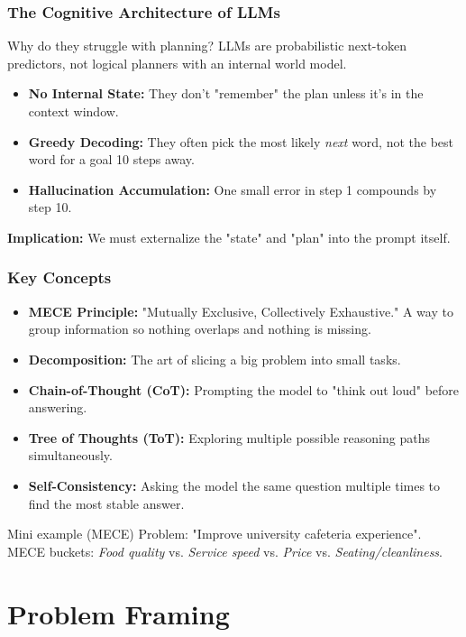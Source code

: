 \documentclass{beamer}
\begin{document}
\begin{frame}
    \frametitle{The Cognitive Architecture of LLMs}
    \begin{block}{Why do they struggle with planning?}
        LLMs are probabilistic next-token predictors, not logical planners with an internal world model.
    \end{block}
    \begin{itemize}
        \item \textbf{No Internal State:} They don't "remember" the plan unless it's in the context window.
        \item \textbf{Greedy Decoding:} They often pick the most likely \textit{next} word, not the best word for a goal 10 steps away.
        \item \textbf{Hallucination Accumulation:} One small error in step 1 compounds by step 10.
    \end{itemize}
    \textbf{Implication:} We must externalize the "state" and "plan" into the prompt itself.
\end{frame}

\begin{frame}
    \frametitle{Key Concepts}
    \begin{itemize}
        \item \textbf{MECE Principle:} "Mutually Exclusive, Collectively Exhaustive." A way to group information so nothing overlaps and nothing is missing.
        \item \textbf{Decomposition:} The art of slicing a big problem into small tasks.
        \item \textbf{Chain-of-Thought (CoT):} Prompting the model to "think out loud" before answering.
        \item \textbf{Tree of Thoughts (ToT):} Exploring multiple possible reasoning paths simultaneously.
        \item \textbf{Self-Consistency:} Asking the model the same question multiple times to find the most stable answer.
    \end{itemize}
    \begin{block}{Mini example (MECE)}
        Problem: "Improve university cafeteria experience".
        MECE buckets: \textit{Food quality} vs. \textit{Service speed} vs. \textit{Price} vs. \textit{Seating/cleanliness}.
    \end{block}
\end{frame}

\section{Problem Framing}
\end{document}
